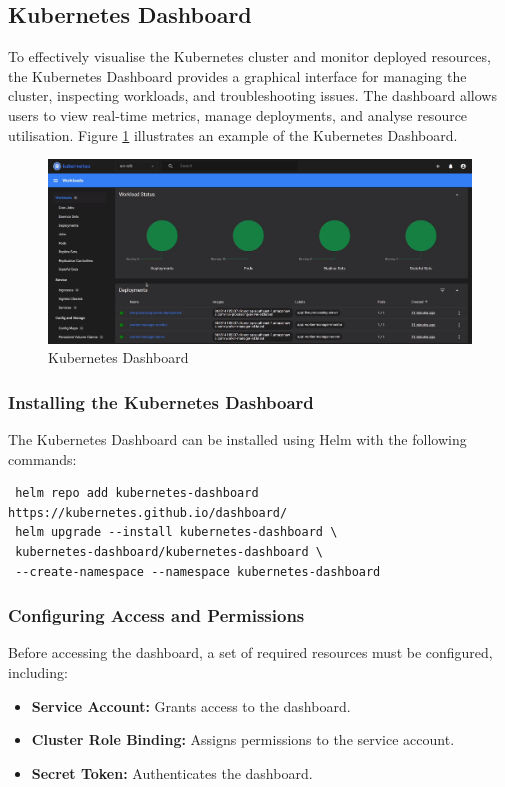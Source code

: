 \subsection{Kubernetes Dashboard}
To effectively visualise the Kubernetes cluster and monitor deployed resources, the Kubernetes Dashboard provides a graphical interface for managing the cluster, inspecting workloads, and troubleshooting issues. The dashboard allows users to view real-time metrics, manage deployments, and analyse resource utilisation. Figure \ref{fig:kubernetes_dashboard} illustrates an example of the Kubernetes Dashboard.
\begin{figure}[ht]
  \centering
  \includegraphics[width=\textwidth]{figures/kubernetes_dashboard.png}
  \caption{Kubernetes Dashboard}
  \label{fig:kubernetes_dashboard}
\end{figure}

\subsubsection{Installing the Kubernetes Dashboard}
The Kubernetes Dashboard can be installed using Helm with the following commands:

\begin{verbatim}
 helm repo add kubernetes-dashboard https://kubernetes.github.io/dashboard/
 helm upgrade --install kubernetes-dashboard \
 kubernetes-dashboard/kubernetes-dashboard \
 --create-namespace --namespace kubernetes-dashboard
\end{verbatim}

\subsubsection{Configuring Access and Permissions}
Before accessing the dashboard, a set of required resources must be configured, including:

\begin{itemize}
  \item \textbf{Service Account:} Grants access to the dashboard.
  \item \textbf{Cluster Role Binding:} Assigns permissions to the service account.
  \item \textbf{Secret Token:} Authenticates the dashboard.
\end{itemize}

